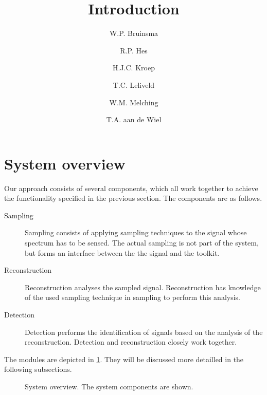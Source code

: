 \documentclass[a4paper, openany, oneside]{memoir}
\title{Introduction}
\author{W.P. Bruinsma \and R.P. Hes \and H.J.C. Kroep \and T.C. Leliveld \and W.M. Melching \and T.A. aan de Wiel}
\begin{document}
\section{System overview}
\label{sec:theory-system-overview}
Our approach consists of several components, which all work together to achieve the functionality specified in the previous section. The components are as follows.

\begin{description}
    \item[Sampling] Sampling consists of applying sampling techniques to the signal whose spectrum has to be sensed. The actual sampling is not part of the system, but forms an interface between the the signal and the toolkit.
    \item[Reconstruction] Reconstruction analyses the sampled signal. Reconstruction has knowledge of the used sampling technique in sampling to perform this analysis.
    \item[Detection] Detection performs the identification of signals based on the analysis of the reconstruction. Detection and reconstruction closely work together.
\end{description}

The modules are depicted in \cref{fig:overview}. They will be discussed more detailled in the following subsections.
\begin{figure}
    \centering
    \caption{System overview. The system components are shown.}
    \label{fig:overview}
\end{figure}
\end{document}

